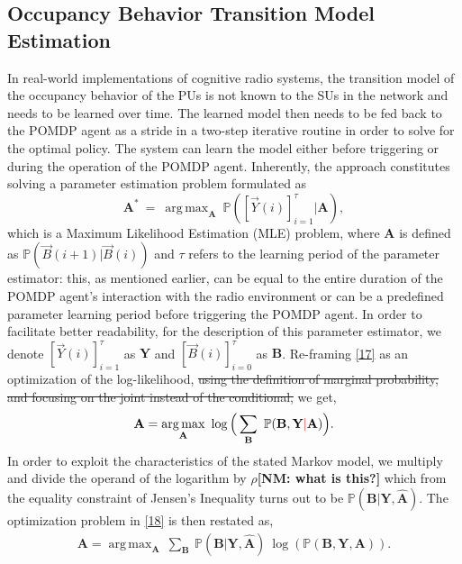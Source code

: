 \documentclass[10pt,twocolumn]{IEEEtran}
\newcommand{\sst}[1]{\st{#1}}
\newcommand{\nm}[1]{{\color{blue}\bf{[NM: #1]}}}
\DeclareMathOperator*{\argmax}{arg\,max}
\newcommand{\add}[1]{{\color{red}{#1}}}
\begin{document}
\subsection{Occupancy Behavior Transition Model Estimation}
In real-world implementations of cognitive radio systems, the transition model of the occupancy behavior of the PUs is not known to the SUs in the network and needs to be learned over time. The learned model then needs to be fed back to the POMDP agent as a stride in a two-step iterative routine in order to solve for the optimal policy. The system can learn the model either before triggering or during the operation of the POMDP agent. Inherently, the approach constitutes solving a parameter estimation problem formulated as
\begin{equation}\label{17}
    \mathbf{A}^{*}\ =\ \argmax_{\mathbf{A}}\ \mathbb{P}([\vec{Y}(i)]_{i=1}^{\tau}|\mathbf{A}),
\end{equation}
which is a Maximum Likelihood Estimation (MLE) problem, where $\mathbf{A}$ is defined as $\mathbb{P}(\vec{B}(i+1)|\vec{B}(i))$ and $\tau$ refers to the learning period of the parameter estimator: this, as mentioned earlier, can be equal to the entire duration of the POMDP agent's interaction with the radio environment or can be a predefined parameter learning period before triggering the POMDP agent. In order to facilitate better readability, for the description of this parameter estimator, we denote $[\vec{Y}(i)]_{i=1}^{\tau}$ as $\mathbf{Y}$ and $[\vec{B}(i)]_{i=0}^{\tau}$ as $\mathbf{B}$. Re-framing \eqref{17} as an optimization of the log-likelihood,\sst{ using the definition of marginal probability, and focusing on the joint instead of the conditional,} we get,
\begin{equation}\label{18}
    \mathbf{A} = \argmax_{\mathbf{A}}\ \log\Big(\sum_{\mathbf{B}}\ \mathbb{P}(\mathbf{B}, \mathbf{Y}\add{|} \mathbf{A})\Big).
\end{equation}
In order to exploit the characteristics of the stated Markov model, we multiply and divide the operand of the logarithm by $\rho$\nm{what is this?} which from the equality constraint of Jensen's Inequality turns out to be $\mathbb{P}(\mathbf{B}|\mathbf{Y}, \hat{\mathbf{A}})$. The optimization problem in \eqref{18} is then restated as,
\begin{equation}\label{19}
    \begin{aligned}
        \mathbf{A} = \argmax_{\mathbf{A}}\ \sum_{\mathbf{B}}\ \mathbb{P}(\mathbf{B}|\mathbf{Y}, \hat{\mathbf{A}})\ \log(\mathbb{P}(\mathbf{B}, \mathbf{Y}, \mathbf{A})).
    \end{aligned}
\end{equation}
\end{document}
